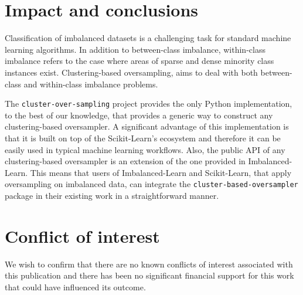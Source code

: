 \documentclass[preprint,12pt, a4paper]{elsarticle}
\begin{document}
\section{Impact and conclusions}

Classification of imbalanced datasets is a challenging task for standard machine learning algorithms. In addition to between-class imbalance, within-class imbalance refers to the case where areas of sparse and dense minority class instances exist. Clustering-based oversampling, aims to deal with both between-class and within-class imbalance problems.

The \texttt{cluster-over-sampling} project provides the only Python implementation, to the best of our knowledge, that provides a generic way to construct any clustering-based oversampler. A significant advantage of this implementation is that it is built on top of the Scikit-Learn's ecosystem and therefore it can be easily used in typical machine learning workflows. Also, the public API of any clustering-based oversampler is an extension of the one provided in Imbalanced-Learn. This means that users of Imbalanced-Learn and Scikit-Learn, that apply oversampling on imbalanced data, can integrate the \texttt{cluster-based-oversampler} package in their existing work in a straightforward manner.

\section{Conflict of interest}

We wish to confirm that there are no known conflicts of interest associated with this publication and there has been no significant financial support for this work that could have influenced its outcome.



\end{document}
